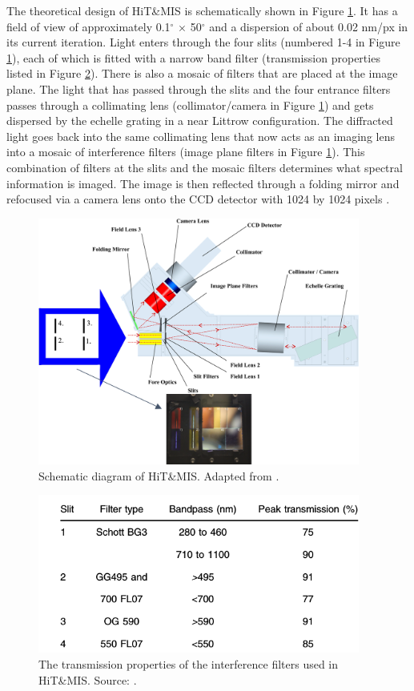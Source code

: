 \documentclass[crop=false,class=mitthesis,oneside,font=12pt]{standalone}
\begin{document}
The theoretical design of HiT\&MIS is schematically shown in Figure \ref{fig:hitmis}. It has a field of view of approximately 0.1$^\circ$ $\times$ 50$^\circ$ and a dispersion of about 0.02 nm/px in its current iteration.  Light enters through the four slits (numbered 1-4 in Figure \ref{fig:hitmis}), each of which is fitted with a narrow band filter (transmission properties listed in Figure \ref{fig:hitmis_tr}). There is also a mosaic of filters that are placed at the image plane. The light that has passed through the slits and the four entrance filters passes through a collimating lens (collimator/camera in Figure \ref{fig:hitmis}) and gets dispersed by the echelle grating in a near Littrow configuration. The diffracted light goes back into the same collimating lens that now acts as an imaging lens into a mosaic of interference filters (image plane filters in Figure \ref{fig:hitmis}). This combination of filters at the slits and the mosaic filters determines what spectral information is imaged. The image is then reflected through a folding mirror and refocused via a camera lens onto the CCD detector with 1024 by 1024 pixels \citep{hitmis}.
\begin{figure}[H]
	\centering\includegraphics[width=25pc]{hitmis.png}
	\caption{Schematic diagram of HiT\&MIS. Adapted from \cite{hitmis}.}
	\label{fig:hitmis}
\end{figure}
\begin{figure}[H]
	\centering\includegraphics[width=25pc]{hitmis_tr.png}
	\caption{The transmission properties of the interference filters used in HiT\&MIS. Source: \cite{hitmis}.}
	\label{fig:hitmis_tr}
\end{figure}
\end{document}

